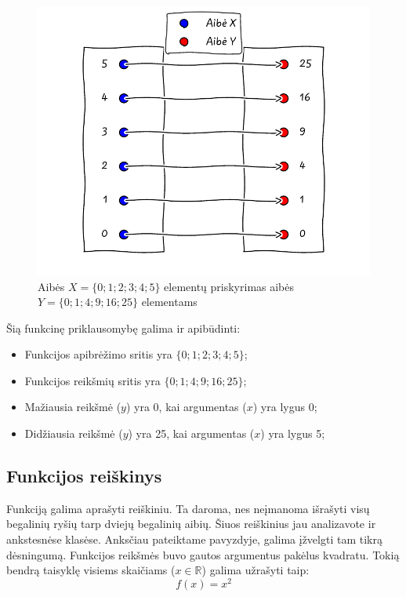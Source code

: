 \documentclass{tufte-handout}
\begin{document}
\begin{figure}[!htpb]
  \includegraphics{./graphs/functions_as_graphs_example1.pdf}
  \caption{Aibės $X =\{0; 1; 2; 3; 4; 5\}$ elementų priskyrimas aibės $Y =\{0;
      1; 4; 9; 16; 25\}$ elementams}
  \label{fig:function_as_set_example}
\end{figure}

Šią funkcinę priklausomybę galima ir apibūdinti:
\begin{itemize}
  \item Funkcijos apibrėžimo sritis yra $\{0; 1; 2; 3; 4; 5\}$;
  \item Funkcijos reikšmių sritis yra $\{0; 1; 4; 9; 16; 25\}$;
  \item Mažiausia reikšmė ($y$) yra 0, kai argumentas ($x$) yra lygus 0;
  \item Didžiausia reikšmė ($y$) yra 25, kai argumentas ($x$) yra lygus 5;
\end{itemize}

\subsection{Funkcijos reiškinys}\label{sec:function_example}

Funkciją galima aprašyti reiškiniu. Ta daroma, nes neįmanoma išrašyti visų
begalinių ryšių tarp dviejų begalinių aibių. Šiuos reiškinius jau analizavote
ir ankstesnėse klasėse. Anksčiau pateiktame pavyzdyje, galima įžvelgti tam
tikrą dėsningumą. Funkcijos reikšmės buvo gautos argumentus pakėlus kvadratu.
Tokią bendrą taisyklę visiems skaičiams ($x\in \mathbb{R}$) galima užrašyti
taip:
$$f(x)=x^2$$
\end{document}
